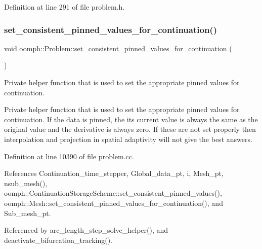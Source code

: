 Definition at line 291 of file problem.\+h.

\mbox{\label{classoomph_1_1Problem_a9494223b38728ea186a68d6c70b7ebd4}} 
\subsubsection{\texorpdfstring{set\+\_\+consistent\+\_\+pinned\+\_\+values\+\_\+for\+\_\+continuation()}{set\_consistent\_pinned\_values\_for\_continuation()}}
{\footnotesize\ttfamily void oomph\+::\+Problem\+::set\+\_\+consistent\+\_\+pinned\+\_\+values\+\_\+for\+\_\+continuation (\begin{DoxyParamCaption}{ }\end{DoxyParamCaption})\hspace{0.3cm}{\ttfamily [protected]}}



Private helper function that is used to set the appropriate pinned values for continuation. 

Private helper function that is used to set the appropriate pinned values for continuation. If the data is pinned, the its current value is always the same as the original value and the derivative is always zero. If these are not set properly then interpolation and projection in spatial adaptivity will not give the best answers. 

Definition at line 10390 of file problem.\+cc.



References Continuation\+\_\+time\+\_\+stepper, Global\+\_\+data\+\_\+pt, i, Mesh\+\_\+pt, nsub\+\_\+mesh(), oomph\+::\+Continuation\+Storage\+Scheme\+::set\+\_\+consistent\+\_\+pinned\+\_\+values(), oomph\+::\+Mesh\+::set\+\_\+consistent\+\_\+pinned\+\_\+values\+\_\+for\+\_\+continuation(), and Sub\+\_\+mesh\+\_\+pt.



Referenced by arc\+\_\+length\+\_\+step\+\_\+solve\+\_\+helper(), and deactivate\+\_\+bifurcation\+\_\+tracking().

\mbox{\label{classoomph_1_1Problem_ab002dc7a6faf97a1bfcd9c098a04f840}} 
